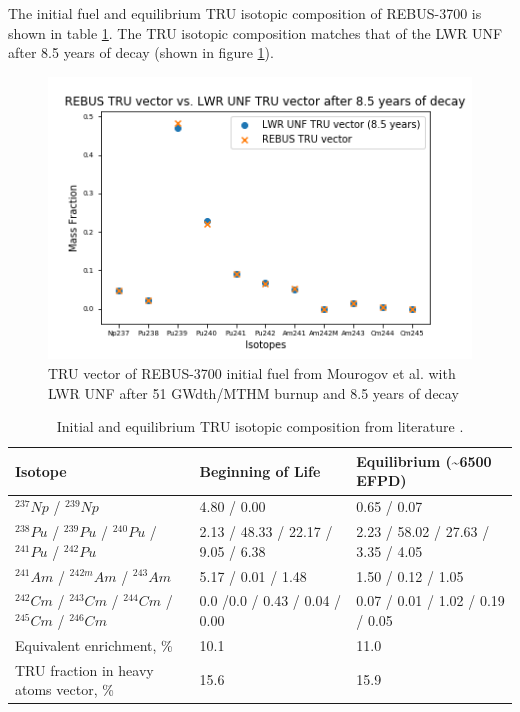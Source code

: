 The initial fuel and equilibrium \gls{TRU} isotopic composition of REBUS-3700 is
shown in table \ref{tab:rebus_comp}. The \gls{TRU} isotopic composition
matches that of the \gls{LWR} \gls{UNF} after 8.5 years of decay (shown
in figure \ref{fig:trutru}).


\begin{figure}[htbp!]
	\begin{center}
		\includegraphics[scale=0.6]{./images/us/trutru.png}
	\end{center}
	\caption{\gls{TRU} vector of REBUS-3700 initial fuel from Mourogov et al. \cite{mourogov_potentialities_2006}
		with \gls{LWR} \gls{UNF} after 51 GWdth/MTHM burnup and 8.5 years of decay}
	\label{fig:trutru}
\end{figure}


\begin{table}[h]
	\centering
	\caption{Initial and equilibrium \gls{TRU} isotopic composition from literature \cite{mourogov_potentialities_2006}.}
	\label{tab:rebus_comp}
	\begin{tabular}{lll}
		\hline
		Isotope & Beginning of Life & Equilibrium (\textasciitilde 6500 \gls{EFPD}) \\
		\hline
		$^{237} Np$ / $^{239} Np$ &  4.80 / 0.00 & 0.65 / 0.07 \\
		$^{238} Pu$ / $^{239} Pu$ / $^{240} Pu$ / $^{241} Pu$ / $^{242} Pu$ & 2.13 / 48.33 / 22.17 / 9.05 / 6.38 & 2.23 / 58.02 / 27.63 / 3.35 / 4.05 \\
		$^{241} Am$ / $^{242m} Am$ / $^{243} Am$ &5.17 / 0.01 / 1.48 & 1.50 / 0.12 / 1.05 \\
		$^{242} Cm$ / $^{243} Cm$ / $^{244} Cm$ / $^{245} Cm$ / $^{246} Cm$ & 0.0 /0.0 / 0.43 / 0.04 / 0.00 & 0.07 / 0.01 / 1.02 / 0.19 / 0.05 \\
		Equivalent enrichment, \% & 10.1 & 11.0 \\
		\gls{TRU} fraction in heavy atoms vector, \% & 15.6 & 15.9 \\
		\hline
	\end{tabular}
\end{table}


